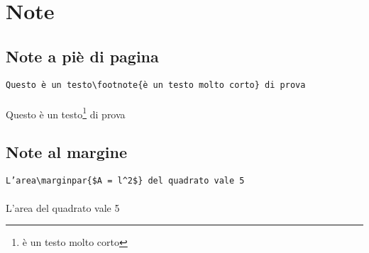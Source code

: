 \section{Note}
\subsection{Note a piè di pagina}
  \verb!Questo è un testo\footnote{è un testo molto corto} di prova!\\~\\
  Questo è un testo\footnote{è un testo molto corto} di prova
\subsection{Note al margine}
  \texttt{L'area\textbackslash marginpar\{\$A = l\^{}2\$\} del quadrato vale 5}\\~\\
   L'area del quadrato vale 5

